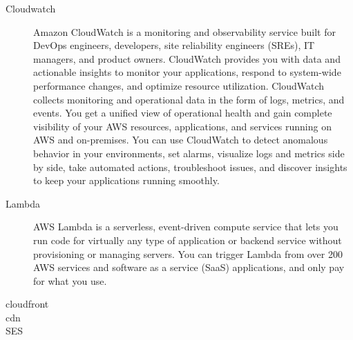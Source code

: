 \begin{multicols}{2}
\begin{description}
\item[Cloudwatch] Amazon CloudWatch is a monitoring and observability service built for DevOps engineers, developers, site reliability engineers (SREs), IT managers, and product owners. CloudWatch provides you with data and actionable insights to monitor your applications, respond to system-wide performance changes, and optimize resource utilization. CloudWatch collects monitoring and operational data in the form of logs, metrics, and events. You get a unified view of operational health and gain complete visibility of your AWS resources, applications, and services running on AWS and on-premises. You can use CloudWatch to detect anomalous behavior in your environments, set alarms, visualize logs and metrics side by side, take automated actions, troubleshoot issues, and discover insights to keep your applications running smoothly.
\item[Lambda] AWS Lambda is a serverless, event-driven compute service that lets you run code for virtually any type of application or backend service without provisioning or managing servers. You can trigger Lambda from over 200 AWS services and software as a service (SaaS) applications, and only pay for what you use.
\item[cloudfront] 
\item[cdn] 
\item[SES]
\end{description}
\end{multicols}

